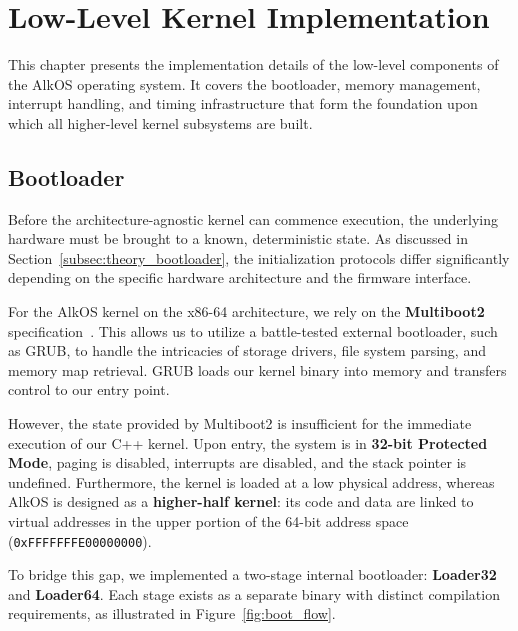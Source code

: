 \documentclass[a4paper,10pt,twoside]{report}
\theoremstyle{definition}
\begin{document}
\chapter{Low-Level Kernel Implementation} 
\label{chap:low_level_implementation} 

This chapter presents the implementation details of the low-level components of the AlkOS operating system. It covers the bootloader, memory management, interrupt handling, and timing infrastructure that form the foundation upon which all higher-level kernel subsystems are built.

\section{Bootloader}
\label{sec:bootloader_implementation}

Before the architecture-agnostic kernel can commence execution, the underlying hardware must be brought to a known, deterministic state. As discussed in Section~\ref{subsec:theory_bootloader}, the initialization protocols differ significantly depending on the specific hardware architecture and the firmware interface.

For the AlkOS kernel on the x86-64 architecture, we rely on the \textbf{Multiboot2} specification~\cite{Multiboot2-Spec}. This allows us to utilize a battle-tested external bootloader, such as GRUB, to handle the intricacies of storage drivers, file system parsing, and memory map retrieval. GRUB loads our kernel binary into memory and transfers control to our entry point.

However, the state provided by Multiboot2 is insufficient for the immediate execution of our C++ kernel. Upon entry, the system is in \textbf{32-bit Protected Mode}, paging is disabled, interrupts are disabled, and the stack pointer is undefined. Furthermore, the kernel is loaded at a low physical address, whereas AlkOS is designed as a \textbf{higher-half kernel}: its code and data are linked to virtual addresses in the upper portion of the 64-bit address space (\texttt{0xFFFFFFFE00000000}).

To bridge this gap, we implemented a two-stage internal bootloader: \textbf{Loader32} and \textbf{Loader64}. Each stage exists as a separate binary with distinct compilation requirements, as illustrated in Figure~\ref{fig:boot_flow}.
\end{document}
